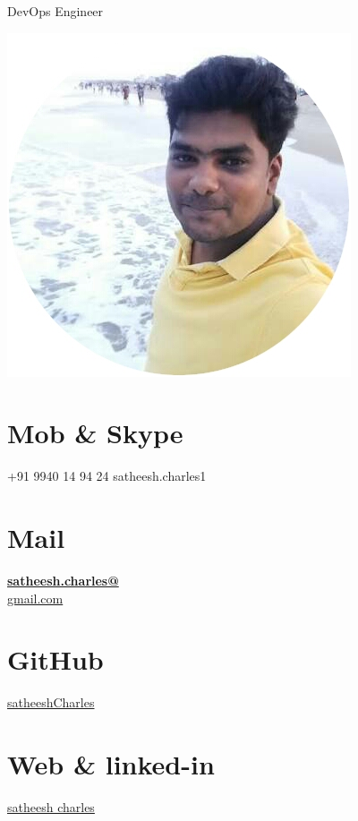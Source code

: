 \documentclass[]{friggeri-cv}
\begin{document}
      {DevOps Engineer}
      

\begin{aside}
  \includegraphics[scale=0.30]{img/Satt.jpg}
  \section{Mob \& Skype}
    +91 9940 14 94 24
    satheesh.charles1
    ~
  \section{Mail}
    \href{mailto:satheesh.charles@wipro.com}{\textbf{satheesh.charles@}\\gmail.com}
    ~
    \section{GitHub}
    \href{https://github.com/satheeshCharles}{satheeshCharles}
    ~
  \section{Web \& linked-in}
    \href{https://www.linkedin.com/in/satheesh-charles/}{satheesh charles}
    ~
    ~
    ~

\end{aside}
\end{document}
